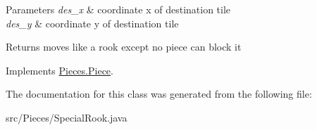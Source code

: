 \begin{DoxyParams}{Parameters}
{\em des\-\_\-x} & coordinate x of destination tile \\
\hline
{\em des\-\_\-y} & coordinate y of destination tile \\
\hline
\end{DoxyParams}
\begin{DoxyReturn}{Returns}
moves like a rook except no piece can block it 
\end{DoxyReturn}


Implements \hyperlink{classPieces_1_1Piece}{Pieces.\-Piece}.



The documentation for this class was generated from the following file\-:\begin{DoxyCompactItemize}
\item 
src/\-Pieces/Special\-Rook.\-java\end{DoxyCompactItemize}
